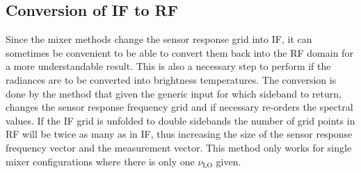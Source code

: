 \subsection{Conversion of IF to RF}
Since the mixer methods change the sensor response grid into IF, it can sometimes be convenient to be able to convert them back into the RF domain for a more understandable result. This is also a necessary step to perform if the radiances are to be converted into brightness temperatures. The conversion is done by the method  that given the generic input for which sideband to return, changes the sensor response frequency grid and if necessary re-orders the spectral values. If the IF grid is unfolded to double sidebands the number of grid points in RF will be twice as many as in IF, thus increasing the size of the sensor response frequency vector and the measurement vector. This method only works for single mixer configurations where there is only one $\nu_\mathrm{LO}$ given.


